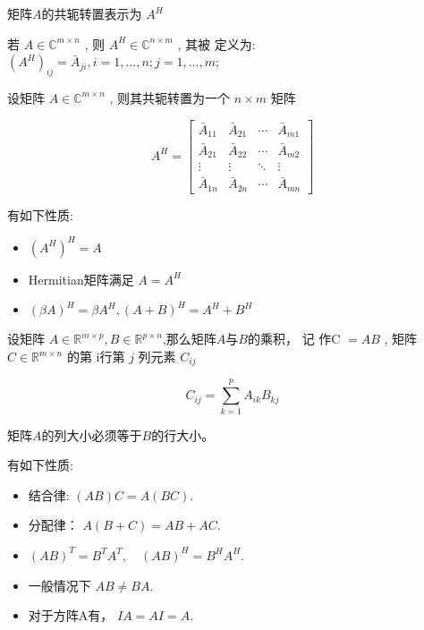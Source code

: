 \begin{definition}[共轭转置]
    矩阵$A$的共轭转置表示为 $ A^{{H}} $
    
    若 $ {A} \in \mathbb{C}^{m \times n} $ , 则 $ A^{H} \in \mathbb{C}^{n \times m} $ , 其被 定义为: $ \left(A^{H}\right)_{i j}=\bar{A}_{j i}, i=1, \ldots, n ; j=1, \ldots, m $;

    设矩阵 $ A \in \mathbb{C}^{m \times n} $ , 则其共轭转置为一个 $ n \times m $ 矩阵

\begin{equation}
A^{H}=\left[\begin{array}{cccc}
\bar{A}_{11} & \bar{A}_{21} & \cdots & \bar{A}_{m 1} \\
\bar{A}_{21} & \bar{A}_{22} & \cdots & \bar{A}_{m 2} \\
\vdots & \vdots & \ddots & \vdots \\
\bar{A}_{1 n} & \bar{A}_{2 n} & \cdots & \bar{A}_{m n}
\end{array}\right]
\end{equation}
\end{definition}

\begin{corollary}[共轭转置的性质]
    有如下性质:
    \begin{itemize}
        \item $ \left(A^{H}\right)^{H}=A $
        \item Hermitian矩阵满足 $ A=A^{H} $
        \item $ (\beta A)^{H}=\beta A^{H},(A+B)^{H}=A^{H}+B^{H} $
    \end{itemize}
\end{corollary}


\begin{definition}[矩阵乘法]
    设矩阵 $ A \in \mathbb{R}^{m \times p}, B \in \mathbb{R}^{p \times n} $,那么矩阵$A$与$B$的乘积， 记 作C $ =A B $ ,  矩阵 $ C \in \mathbb{R}^{m \times n} $ 的第 i行第 $ j $ 列元素 $ C_{i j} $

    \begin{equation}
{C}_{i j}=\sum_{k=1}^{p} A_{i k} B_{k j}
\end{equation}

\end{definition}

\begin{remark}
    矩阵$A$的列大小必须等于$B$的行大小。
\end{remark} 

\begin{corollary}[矩阵乘法性质]
    有如下性质:
    \begin{itemize}
        \item 结合律: $ (A B) C=A(B C) $.
        \item 分配律： $ A(B+C)=A B+A C $.
        \item $ (A B)^{T}=B^{T} A^{T}, \quad(A B)^{{H}}=B^{H} A^{H} $.
        \item 一般情况下 $ A B \neq B A $.
        \item 对于方阵A有， $ I A=A I=A $.
    \end{itemize} 
\end{corollary}

